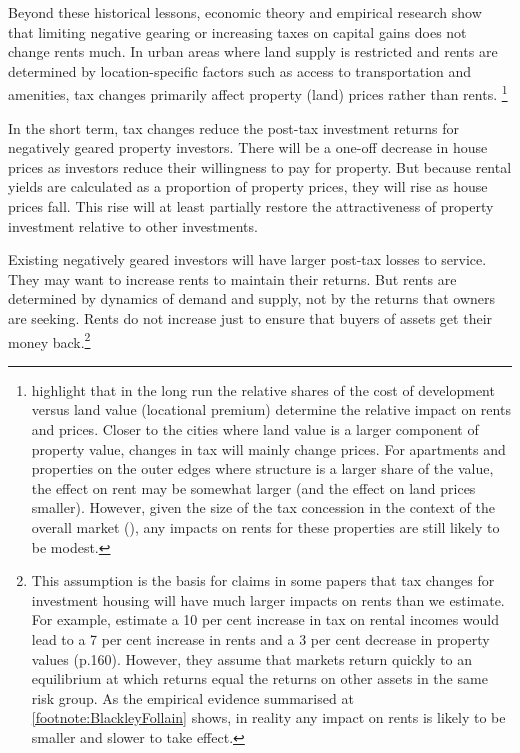 Beyond these historical lessons, economic theory and empirical research show that limiting negative gearing or increasing taxes on capital gains does not change rents much. In urban areas where land supply is restricted and rents are determined by location-specific factors such as access to transportation and amenities, tax changes primarily affect property (land) prices rather than rents.%
\footnote{\textcite{CapozzaGreenHendershott} \textcite{StapledonRoberts2016} highlight that in the long run the relative shares of the cost of development versus land value (locational premium) determine the relative impact on rents and prices. Closer to the cities where land value is a larger component of property value, changes in tax will mainly change prices. For apartments and properties on the outer edges where structure is a larger share of the value, the effect on rent may be somewhat larger (and the effect on land prices smaller). However, given the size of the tax concession in the context of the overall market (), any impacts on rents for these properties are still likely to be modest.} 

In the short term, tax changes reduce the post-tax investment returns for negatively geared property investors. There will be a one-off decrease in house prices as investors reduce their willingness to pay for property. But because rental yields are calculated as a proportion of property prices, they will rise as house prices fall. This rise will at least partially restore the attractiveness of property investment relative to other investments. 

Existing negatively geared investors will have larger post-tax losses to service. They may want to increase rents to maintain their returns. But rents are determined by dynamics of demand and supply, not by the returns that owners are seeking. Rents do not increase just to ensure that buyers of assets get their money back.\footnote{This assumption is the basis for claims in some papers that tax changes for investment housing will have much larger impacts on rents than we estimate. For example, \textcite{AbelsonJoyeux2007} estimate a 10 per cent increase in tax on rental incomes would lead to a 7 per cent increase in rents and a 3 per cent decrease in property values (p.160). However, they assume that markets return quickly to an equilibrium at which returns equal the returns on other assets in the same risk group. As the empirical evidence summarised at \cref{footnote:BlackleyFollain} shows, in reality any impact on rents is likely to be smaller and slower to take effect. } 

